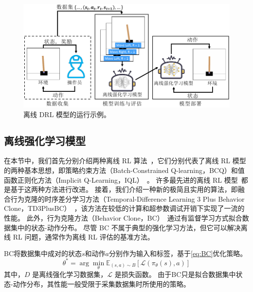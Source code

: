 \begin{figure}[!t]
    \includegraphics[width=\hsize]{figure/orl_auditor/offline-rlch.pdf}
    \caption{离线 DRL 模型的运行示例。}
    \label{fig:running example}
\end{figure}

\subsection{离线强化学习模型}
\label{sec:offline reinforcement learning model}
在本节中，我们首先分别介绍两种离线 RL 算法~\cite{DBLP:conf/icml/FujimotoMP19, DBLP:journals/corr/abs-1910-01708, DBLP:conf/iclr/KostrikovNL22}，它们分别代表了离线 RL 模型的两种基本思想，即策略约束方法（Batch-Constrained Q-learning，BCQ）和值函数正则化方法（Implicit Q-Learning，IQL）~\cite{DBLP:journals/corr/abs-2203-01387}。
许多最先进的离线 RL 模型~\cite{DBLP:conf/nips/YuKRRLF21, DBLP:conf/nips/KidambiRNJ20, DBLP:conf/nips/FujimotoG21, DBLP:conf/iclr/KostrikovNL22}都是基于这两种方法进行改进。
接着，我们介绍一种新的极简且实用的算法，即融合行为克隆的时序差分学习方法（Temporal-Difference Learning 3 Plus Behavior Clone，TD3PlusBC）~\cite{DBLP:conf/nips/FujimotoG21}，该方法在较低的计算和超参数调试开销下实现了一流的性能。
此外，行为克隆方法（Behavior Clone，BC）~\cite{DBLP:conf/nips/Pomerleau88}通过有监督学习方式拟合数据集中的状态-动作分布。
尽管 BC 不属于典型的强化学习方法，但它可以解决离线 RL 问题，通常作为离线 RL 评估的基准方法。

BC将数据集中成对的状态$s$和动作$a$分别作为输入和标签，基于\autoref{eq:BC}优化策略。
\begin{equation}
    \theta^*=\arg \min _\theta \mathbb{E}_{(s, a) \sim B}\left[\mathcal{L}\left(\pi_\theta(s), a\right)\right]
    \label{eq:BC}
\end{equation}
其中，$D$ 是离线强化学习数据集，$\mathcal{L}$ 是损失函数。
由于BC只是拟合数据集中状态-动作分布，其性能一般受限于采集数据集时所使用的策略。

